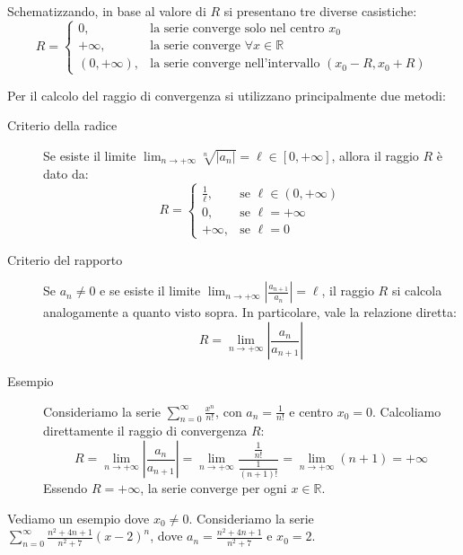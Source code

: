 \documentclass[12pt]{report}
\newcommand{\R}{\mathbb{R}}
\begin{document}
	Schematizzando, in base al valore di $R$ si presentano tre diverse casistiche:
	\[
	R = \begin{cases} 
		0, & \text{la serie converge solo nel centro } x_0 \\ 
		+\infty, & \text{la serie converge } \forall x \in \R \\ 
		(0, +\infty), & \text{la serie converge nell'intervallo } (x_0 - R, x_0 + R) 
	\end{cases}
	\]
	
	Per il calcolo del raggio di convergenza si utilizzano principalmente due metodi:
	
	\begin{description}
		
		\item [Criterio della radice] Se esiste il limite $\lim_{n \to +\infty} \sqrt[n]{|a_n|} = \ell \in [0, +\infty]$, allora il raggio $R$ è dato da:
		\[
		R = \begin{cases} 
			\frac{1}{\ell}, & \text{se } \ell \in (0, +\infty) \\ 
			0, & \text{se } \ell = +\infty \\ 
			+\infty, & \text{se } \ell = 0 
		\end{cases}
		\]
		
		\item [Criterio del rapporto] Se $a_n \neq 0$ e se esiste il limite $\lim_{n \to +\infty} \left| \frac{a_{n+1}}{a_n} \right| = \ell$, il raggio $R$ si calcola analogamente a quanto visto sopra. In particolare, vale la relazione diretta:
		\[
		R = \lim_{n \to +\infty} \left| \frac{a_n}{a_{n+1}} \right|
		\]
		
	\end{description}
	
	\begin{description}
		
		\item [Esempio] Consideriamo la serie $\sum_{n=0}^{\infty} \frac{x^n}{n!}$, con $a_n = \frac{1}{n!}$ e centro $x_0 = 0$. Calcoliamo direttamente il raggio di convergenza $R$:
		\[
		R = \lim_{n \to +\infty} \left| \frac{a_n}{a_{n+1}} \right| = \lim_{n \to +\infty} \frac{\frac{1}{n!}}{\frac{1}{(n+1)!}} = \lim_{n \to +\infty} (n+1) = +\infty
		\]
		Essendo $R = +\infty$, la serie converge per ogni $x \in \R$.
		
	\end{description}
	
	Vediamo un esempio dove $x_0 \neq 0$.
	Consideriamo la serie $\sum_{n=0}^{\infty} \frac{n^2+4n+1}{n^2+7} (x-2)^n$, dove $a_n = \frac{n^2+4n+1}{n^2+7}$ e $x_0 = 2$.
	
\end{document}

